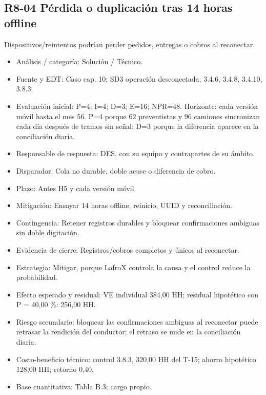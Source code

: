 \subsection*{R8-04 \textemdash{} Pérdida o duplicación tras 14 horas offline}

Dispositivos/reintentos podrían perder pedidos, entregas o cobros al reconectar.

\begin{itemize}[leftmargin=*,itemsep=3pt]
\item Análisis / categoría: Solución / Técnico.
\item Fuente y EDT: Caso cap. 10; SD3 operación desconectada; 3.4.6, 3.4.8, 3.4.10, 3.8.3.
\item Evaluación inicial: P=4; I=4; D=3; E=16; NPR=48. Horizonte: cada versión móvil hasta el mes 56. P=4 porque 62 preventistas y 96 camiones sincronizan cada día después de tramos sin señal; D=3 porque la diferencia aparece en la conciliación diaria.
\item Responsable de respuesta: DES, con su equipo y contrapartes de su ámbito.
\item Disparador: Cola no durable, doble acuse o diferencia de cobro.
\item Plazo: Antes H5 y cada versión móvil.
\item Mitigación: Ensayar 14 horas offline, reinicio, UUID y reconciliación.
\item Contingencia: Retener registros durables y bloquear confirmaciones ambiguas sin doble digitación.
\item Evidencia de cierre: Registros/cobros completos y únicos al reconectar.
\item Estrategia: Mitigar, porque LafroX controla la causa y el control reduce la probabilidad.
\item Efecto esperado y residual: VE individual 384,00 HH; residual hipotético con P = 40,00 \%: 256,00 HH.
\item Riesgo secundario: bloquear las confirmaciones ambiguas al reconectar puede retrasar la rendición del conductor; el retraso se mide en la conciliación diaria.
\item Costo-beneficio técnico: control 3.8.3, 320,00 HH del T-15; ahorro hipotético 128,00 HH; retorno 0,40.
\item Base cuantitativa: Tabla B.3; cargo propio.
\end{itemize}

